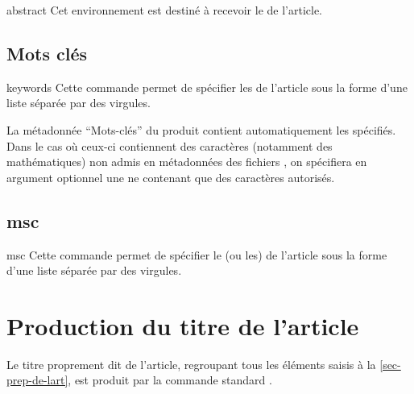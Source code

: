 \documentclass[french,nolocaltoc]{nwejmart}
\newtheorem[style=definition]{fait}
\newtheorem[title=expérience]{experience}
\newtheorem[title-plural=anneaux]{anneau}
\newtheorem[title=idéal,title-plural=idéaux]{ideal}
\begin{document}
\begin{docEnvironment}[doc description=\mandatory,doclang/environment content=résumé]{abstract}{}
  Cet environnement est destiné à recevoir le  de l'article.
\end{docEnvironment}

\subsection{Mots clés}

\begin{docCommand}[doc description=\mandatory]{keywords}{}
  Cette commande permet de spécifier les  de l'article sous la
  forme d'une liste séparée par des virgules.

  La métadonnée \enquote{Mots-clés} du  produit contient
  automatiquement les  spécifiés.  Dans le cas où ceux-ci
  contiennent des caractères (notamment des mathématiques) non admis en
  métadonnées des fichiers  , on spécifiera en argument optionnel une
   ne contenant que des caractères autorisés.
\end{docCommand}

\begin{bodycode}[listing options={deletekeywords={[5]keywords}}]
\end{bodycode}

\subsection{\texorpdfstring{\acrfull{msc}}{MSC}}

\begin{docCommand}[doc description=\mandatory]{msc}{}
  Cette commande permet de spécifier le (ou les)  de
  l'article sous la forme d'une liste séparée par des virgules.
\end{docCommand}

\section{Production du titre de l'article}
\label{sec-creation-du-titre}

Le titre proprement dit de l'article, regroupant tous les éléments saisis à la
\vref{sec-prep-de-lart}, est produit par la commande standard
.
\end{document}
